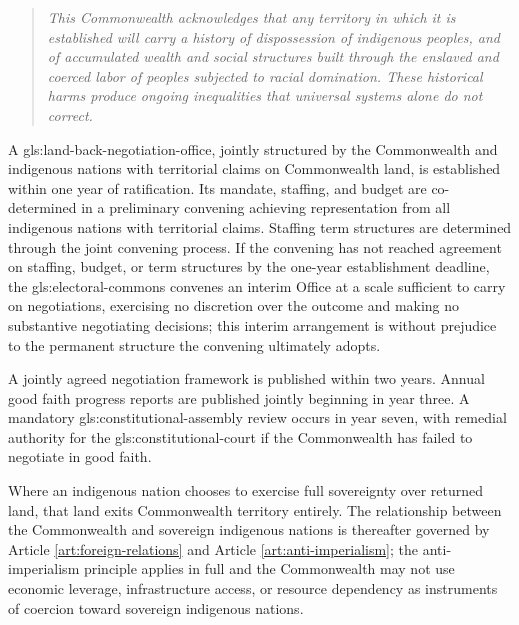 

\begin{quote}
    \itshape
    This Commonwealth acknowledges that any territory in which it is established will carry a history of dispossession of indigenous peoples, and of accumulated wealth and social structures built through the enslaved and coerced labor of peoples subjected to racial domination. These historical harms produce ongoing inequalities that universal systems alone do not correct.
\end{quote}


A \gls{gls:land-back-negotiation-office}, jointly structured by the Commonwealth and indigenous nations with territorial claims on Commonwealth land, is established within one year of ratification. Its mandate, staffing, and budget are co-determined in a preliminary convening achieving representation from all indigenous nations with territorial claims. Staffing term structures are determined through the joint convening process. If the convening has not reached agreement on staffing, budget, or term structures by the one-year establishment deadline, the \gls{gls:electoral-commons} convenes an interim Office at a scale sufficient to carry on negotiations, exercising no discretion over the outcome and making no substantive negotiating decisions; this interim arrangement is without prejudice to the permanent structure the convening ultimately adopts.

A jointly agreed negotiation framework is published within two years. Annual good faith progress reports are published jointly beginning in year three. A mandatory \gls{gls:constitutional-assembly} review occurs in year seven, with remedial authority for the \gls{gls:constitutional-court} if the Commonwealth has failed to negotiate in good faith.

Where an indigenous nation chooses to exercise full sovereignty over returned land, that land exits Commonwealth territory entirely. The relationship between the Commonwealth and sovereign indigenous nations is thereafter governed by Article \ref{art:foreign-relations} and Article \ref{art:anti-imperialism}; the anti-imperialism principle applies in full and the Commonwealth may not use economic leverage, infrastructure access, or resource dependency as instruments of coercion toward sovereign indigenous nations.

